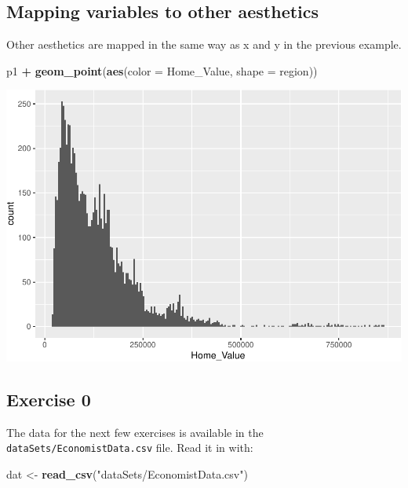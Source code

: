\documentclass[
]{book}
\newenvironment{Shaded}{\begin{snugshade}}{\end{snugshade}}
\newcommand{\DataTypeTok}[1]{\textcolor[rgb]{0.13,0.29,0.53}{#1}}
\newcommand{\KeywordTok}[1]{\textcolor[rgb]{0.13,0.29,0.53}{\textbf{#1}}}
\newcommand{\NormalTok}[1]{#1}
\newcommand{\OperatorTok}[1]{\textcolor[rgb]{0.81,0.36,0.00}{\textbf{#1}}}
\newcommand{\StringTok}[1]{\textcolor[rgb]{0.31,0.60,0.02}{#1}}
\begin{document}
\hypertarget{mapping-variables-to-other-aesthetics}{%
\subsection{Mapping variables to other aesthetics}\label{mapping-variables-to-other-aesthetics}}

Other aesthetics are mapped in the same way as x and y in the previous example.

\begin{Shaded}
\begin{Highlighting}[]
\NormalTok{p1 }\OperatorTok{+}
\StringTok{  }\KeywordTok{geom\_point}\NormalTok{(}\KeywordTok{aes}\NormalTok{(}\DataTypeTok{color =}\NormalTok{ Home\_Value, }\DataTypeTok{shape =}\NormalTok{ region))}
\end{Highlighting}
\end{Shaded}

\includegraphics{R/Rgraphics/figures/unnamed-chunk-164-1.pdf}

\hypertarget{exercise-0-2}{%
\subsection{Exercise 0}\label{exercise-0-2}}

The data for the next few exercises is available in the \texttt{dataSets/EconomistData.csv} file. Read it in with:

\begin{Shaded}
\begin{Highlighting}[]
\NormalTok{dat \textless{}{-}}\StringTok{ }\KeywordTok{read\_csv}\NormalTok{(}\StringTok{"dataSets/EconomistData.csv"}\NormalTok{)}
\end{Highlighting}
\end{Shaded}
\end{document}

